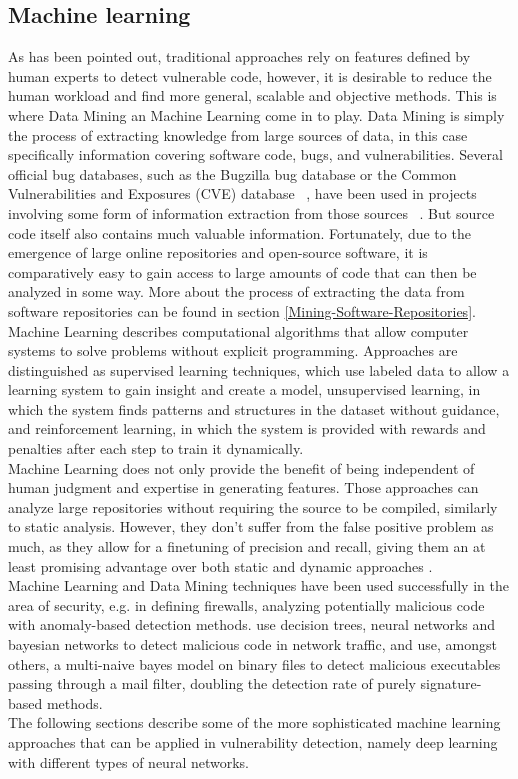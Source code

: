 \documentclass[
a4paper,
pagesize,
pdftex,
12pt,
twoside, %
BCOR=5mm, %
ngerman,
fleqn,
final,
]{scrartcl}
\begin{document}
	\subsection{Machine learning}
	As has been pointed out, traditional approaches rely on features defined by human experts to detect vulnerable code, however, it is desirable to reduce the human workload and find more general, scalable and objective methods. This is where Data Mining an Machine Learning come in to play. Data Mining is simply the process of extracting knowledge from large sources of data, in this case specifically information covering software code, bugs, and vulnerabilities. Several official bug databases, such as the Bugzilla bug database or the Common Vulnerabilities and Exposures (CVE) database ~\cite{CVE}, have been used in projects involving some form of information extraction from those sources ~\cite{Wijayasekara.2012}. But source code itself also contains much valuable information. Fortunately, due to the emergence of large online repositories and open-source software, it is comparatively easy to gain access to large amounts of code that can then be analyzed in some way. More about the process of extracting the data from software repositories can be found in section \ref{Mining-Software-Repositories}.\\
	Machine Learning describes computational algorithms that allow computer systems to solve problems without explicit programming. Approaches are distinguished as supervised learning techniques, which use labeled data to allow a learning system to gain insight and create a model, unsupervised learning, in which the system finds patterns and structures in the dataset without guidance, and reinforcement learning, in which the system is provided with rewards and penalties after each step to train it dynamically.\\
	Machine Learning does not only provide the benefit of being independent of human judgment and expertise in generating features. Those approaches can analyze large repositories without requiring the source to be compiled, similarly to static analysis. However, they don't suffer from the false positive problem as much, as they allow for a finetuning of precision and recall, giving them an at least promising advantage over both static and dynamic approaches \cite{Russell.2018}. \\
	Machine Learning and Data Mining techniques have been used successfully in the area of security, e.g. in defining firewalls, analyzing potentially malicious code with anomaly-based detection methods. \cite{Elovici.2007} use decision trees, neural networks and bayesian networks to detect malicious code in network traffic, and \cite{Schultz.2000} use, amongst others, a multi-naive bayes model on binary files to detect malicious executables passing through a mail filter, doubling the detection rate of purely signature-based methods.\\
	The following sections describe some of the more sophisticated machine learning approaches that can be applied in vulnerability detection, namely deep learning with different types of neural networks. 
	
\end{document}
